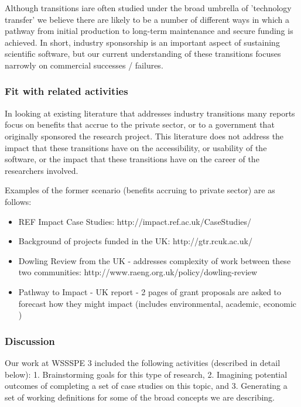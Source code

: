 Although transitions iare often studied under the broad umbrella of 'technology transfer' we believe there are likely to be a number of different ways in which a pathway from initial production to long-term maintenance and secure funding is achieved. In short, industry sponsorship is an important aspect of sustaining scientific software, but our current understanding of these transitions focuses narrowly on commercial successes / failures.

\subsubsection{Fit with related activities}

In looking at existing literature that addresses industry transitions many reports focus on benefits that accrue to the private sector, or to a government that originally sponsored the research project. This literature does not address the impact that these transitions have on the accessibility, or usability of the software, or the impact that these transitions have on the career of the researchers involved. 

Examples of the former scenario (benefits accruing to private sector) are as follows:

\begin{itemize}
\item REF Impact Case Studies: http://impact.ref.ac.uk/CaseStudies/
\item Background of projects funded in the UK: http://gtr.rcuk.ac.uk/ 
\item Dowling Review from the UK - addresses complexity of work between these two communities: http://www.raeng.org.uk/policy/dowling-review 
\item Pathway to Impact - UK report  - 2 pages of grant proposals are asked to forecast how they might impact (includes environmental, academic, economic )
\end{itemize}

\subsubsection{Discussion}

Our work at WSSSPE 3 included the following activities (described in detail below): 1. Brainstorming goals for this type of research, 2. Imagining potential outcomes of completing a set of case studies on this topic, and 3. Generating a set of working definitions for some of the broad concepts we are describing. 

